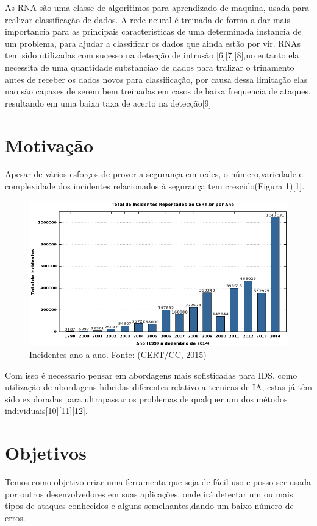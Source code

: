 \documentclass[
	12pt,				%
	openright,			%
	oneside,
	a4paper,			%
	english,			%
	french,				%
	spanish,			%
	brazil				%
	]{abntex2}
\begin{document}
As RNA são uma classe de algoritimos para aprendizado de maquina, usada para realizar classificação de dados. A rede neural é treinada de forma a dar mais importancia para as principais caracteristicas de uma determinada instancia de um problema, para ajudar a classificar os dados que ainda estão por vir. 
RNAs tem sido utilizadas com sucesso na detecção de intrusão [6][7][8],no entanto ela necessita de uma quantidade substanciao de dados para tralizar o trinamento antes de receber os dados novos para classificação, por causa dessa limitação elas nao são capazes de serem bem treinadas em casos de baixa frequencia de ataques, resultando em uma baixa taxa de acerto na detecção[9]


\section{Motivação}

Apesar de vários esforços de prover a segurança em redes, o número,variedade e complexidade dos incidentes relacionados à segurança tem crescido(Figura 1)[1].

\begin{figure}[!htb]
     \centering
     \includegraphics[scale=0.5]{Imagens/IntroGraf.png}
     \caption{Incidentes ano a ano. Fonte: (CERT/CC, 2015)}
\end{figure}

Com isso é necessario pensar em abordagens mais sofisticadas para IDS, como utilização de abordagens hibridas diferentes relativo a tecnicas de IA, estas já têm sido exploradas para ultrapassar os problemas de qualquer um dos métodos individuais[10][11][12]. 


\section{Objetivos}
Temos como objetivo criar uma ferramenta que seja de fácil uso e posso ser usada por outros desenvolvedores em suas aplicações, onde irá detectar um ou mais tipos de ataques conhecidos e alguns semelhantes,dando um baixo número de erros.
\end{document}
